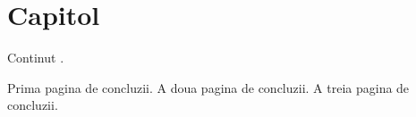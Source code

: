 \documentclass[a4paper,12pt]{report}
\begin{document}
\chapter{Capitol}
Continut \cite{png_spec}.

\finalConclusionChapter
Prima pagina de concluzii.
\newpage
A doua pagina de concluzii.
\newpage
A treia pagina de concluzii.
\newpage

\bibliographyChapter
\end{document}
